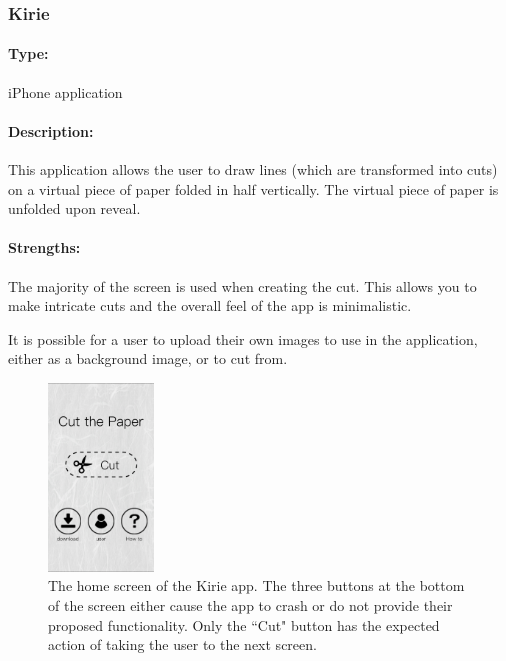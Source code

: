 \documentclass[11pt]{article}
\begin{document}
            
            \subsubsection{Kirie}
            
                \paragraph{Type:} iPhone application \cite{Kirie}

                \paragraph{Description:}
                This application allows the user to draw lines (which are transformed into cuts) on a virtual piece of paper folded in half vertically. The virtual piece of paper is unfolded upon reveal. 

                \paragraph{Strengths:}
                The majority of the screen is used when creating the cut. This allows you to make intricate cuts and the overall feel of the app is minimalistic. 
                
                It is possible for a user to upload their own images to use in the application, either as a background image, or to cut from.
                
                 \begin{figure}
                    \centering
                    \includegraphics[width=0.25\textwidth]{Images/kirieMain.PNG}
                    \caption{The home screen of the Kirie app. The three buttons at the bottom of the screen either cause the app to crash or do not provide their proposed functionality. Only the ``Cut" button has the expected action of taking the user to the next screen.}
                    \label{fig:kirieMain}
                \end{figure}
                
\end{document}

